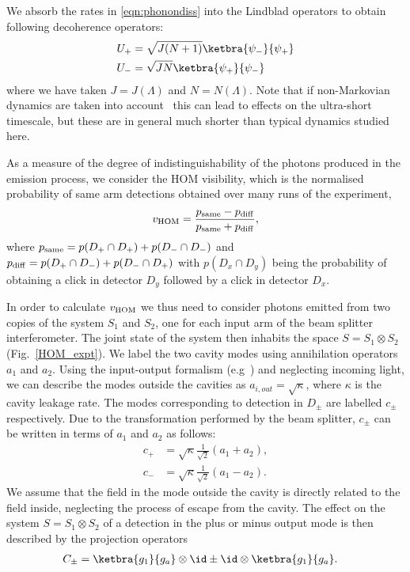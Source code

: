 We absorb the rates in \eqref{eqn:phonondiss} into the Lindblad operators to obtain following decoherence operators:
\begin{eqnarray}
  U_+ &= \sqrt{J(N+1)}\ketbra{\psi_-}{\psi_+} \\
  U_- &= \sqrt{JN}\ketbra{\psi_+}{\psi_-}
\end{eqnarray}
where we have taken $J = J(\Lambda)$ and $N = N(\Lambda)$. Note that if non-Markovian dynamics are taken into account~\cite{neilsen12} this can lead to effects on the ultra-short timescale, but these are in general much shorter than typical dynamics studied here.

As a measure of the degree of indistinguishability of the photons produced in the emission process, we consider the HOM visibility, which is the normalised probability of same arm detections obtained over many runs of the experiment,
\begin{eqnarray}
v_{\rm HOM} = \frac{p_{\rm same} - p_{\rm diff}}{p_{\rm same} + p_{\rm diff}},
\end{eqnarray}
where $p_{\rm same}  = p(D_+ \cap D_+) + p({D_- \cap D_-})$ and $p_{\rm diff}  = p(D_+ \cap D_-) + p({D_- \cap D_+})$ with $p(D_x \cap D_y)$ being the probability of obtaining a click in detector $D_y$ followed by a click in detector $D_x$.

In order to calculate $v_{\rm HOM}$ we thus need to consider photons emitted from two copies of the system $S_1$ and $S_2$, one for each input arm of the beam splitter interferometer. The joint state of the system then inhabits the space $S= S_1 \otimes S_2$ (Fig.~\ref{HOM_expt}).
We label the two cavity modes using annihilation operators $a_1$ and $a_2$. Using the input-output formalism (e.g~\cite{walls+milburn}) and neglecting incoming light, we can describe the modes outside the cavities as $a_{i, out} = \sqrt{\kappa}$, where $\kappa$ is the cavity leakage rate. The modes corresponding to detection in $D_\pm$ are labelled $c_\pm$ respectively. Due to the transformation performed by the beam splitter, $c_\pm$ can be written in terms of $a_1$ and $a_2$ as follows:
\begin{eqnarray}
  c_+ &= \sqrt{\kappa} \frac{1}{\sqrt{2}}\left( a_1 + a_2 \right), \\
  c_- &= \sqrt{\kappa} \frac{1}{\sqrt{2}}\left( a_1 - a_2 \right).
\end{eqnarray}
We assume that the field in the mode outside the cavity is directly related to the field inside, neglecting the process of escape from the cavity.
The effect on the system $S= S_1 \otimes S_2$ of a detection in the plus or minus output mode is then described by the projection operators
\begin{eqnarray}
  C_\pm &= \ketbra{g_1}{g_a}\otimes\id \pm \id\otimes\ketbra{g_1}{g_a}.
\end{eqnarray}

